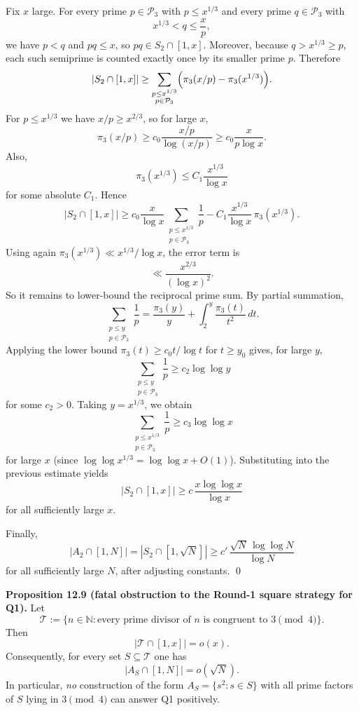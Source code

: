 Fix $x$ large.
For every prime $p\in\mathcal P_3$ with $p\le x^{1/3}$ and every prime $q\in\mathcal P_3$ with
\[
x^{1/3}<q\le \frac{x}{p},
\]
we have $p<q$ and $pq\le x$, so $pq\in S_2\cap[1,x]$.
Moreover, because $q>x^{1/3}\ge p$, each such semiprime is counted exactly once by its smaller prime $p$.
Therefore
\[
|S_2\cap[1,x]|
\ge
\sum_{\substack{p\le x^{1/3}\\ p\in\mathcal P_3}}
\Bigl(\pi_3(x/p)-\pi_3(x^{1/3})\Bigr).
\]
For $p\le x^{1/3}$ we have $x/p\ge x^{2/3}$, so for large $x$,
\[
\pi_3(x/p)\ge c_0\frac{x/p}{\log(x/p)}\ge c_0\frac{x}{p\log x}.
\]
Also,
\[
\pi_3(x^{1/3})\le C_1\frac{x^{1/3}}{\log x}
\]
for some absolute $C_1$.
Hence
\[
|S_2\cap[1,x]|
\ge
c_0\frac{x}{\log x}
\sum_{\substack{p\le x^{1/3}\\ p\in\mathcal P_3}}\frac1p
-
C_1\frac{x^{1/3}}{\log x}\,\pi_3(x^{1/3}).
\]
Using again $\pi_3(x^{1/3})\ll x^{1/3}/\log x$, the error term is
\[
\ll \frac{x^{2/3}}{(\log x)^2}.
\]
So it remains to lower-bound the reciprocal prime sum.
By partial summation,
\[
\sum_{\substack{p\le y\\ p\in\mathcal P_3}}\frac1p
=
\frac{\pi_3(y)}{y}+
\int_{2}^{y}\frac{\pi_3(t)}{t^2}\,dt.
\]
Applying the lower bound $\pi_3(t)\ge c_0 t/\log t$ for $t\ge y_0$ gives, for large $y$,
\[
\sum_{\substack{p\le y\\ p\in\mathcal P_3}}\frac1p
\ge
c_2\log\log y
\]
for some $c_2>0$.
Taking $y=x^{1/3}$, we obtain
\[
\sum_{\substack{p\le x^{1/3}\\ p\in\mathcal P_3}}\frac1p
\ge c_3\log\log x
\]
for large $x$ (since $\log\log x^{1/3}=\log\log x+O(1)$).
Substituting into the previous estimate yields
\[
|S_2\cap[1,x]|
\ge c\,\frac{x\log\log x}{\log x}
\]
for all sufficiently large $x$.

Finally,
\[
|A_2\cap[1,N]|=|S_2\cap[1,\sqrt N]|
\ge c'\,\frac{\sqrt N\,\log\log N}{\log N}
\]
for all sufficiently large $N$, after adjusting constants.
\qed

\medskip
\noindent\textbf{Proposition 12.9 (fatal obstruction to the Round-1 square strategy for Q1).}
Let
\[
\mathcal T:=\{n\in\mathbb N: \text{every prime divisor of $n$ is congruent to }3\pmod 4\}.
\]
Then
\[
|\mathcal T\cap[1,x]|=o(x).
\]
Consequently, for every set $S\subseteq\mathcal T$ one has
\[
|A_S\cap[1,N]|=o(\sqrt N).
\]
In particular, \emph{no} construction of the form $A_S=\{s^2:s\in S\}$ with all prime factors of $S$ lying in $3\pmod 4$ can answer Q1 positively.

